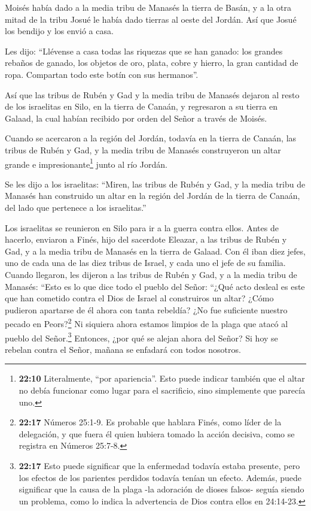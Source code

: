  Moisés había dado a la media tribu de Manasés la tierra de
Basán, y a la otra mitad de la tribu Josué le había dado tierras al
oeste del Jordán. Así que Josué los bendijo y los envió a casa.

 Les dijo: ``Llévense a casa todas las riquezas que se han
ganado: los grandes rebaños de ganado, los objetos de oro, plata, cobre
y hierro, la gran cantidad de ropa. Compartan todo este botín con sus
hermanos''.

 Así que las tribus de Rubén y Gad y la media tribu de
Manasés dejaron al resto de los israelitas en Silo, en la tierra de
Canaán, y regresaron a su tierra en Galaad, la cual habían recibido por
orden del Señor a través de Moisés.

 Cuando se acercaron a la región del Jordán, todavía en la
tierra de Canaán, las tribus de Rubén y Gad, y la media tribu de Manasés
construyeron un altar grande e impresionante\footnote{\textbf{22:10}
  Literalmente, ``por apariencia''. Esto puede indicar también que el
  altar no debía funcionar como lugar para el sacrificio, sino
  simplemente que parecía uno.} junto al río Jordán.

 Se les dijo a los israelitas: ``Miren, las tribus de Rubén
y Gad, y la media tribu de Manasés han construido un altar en la región
del Jordán de la tierra de Canaán, del lado que pertenece a los
israelitas.''

 Los israelitas se reunieron en Silo para ir a la guerra
contra ellos.  Antes de hacerlo, enviaron a Finés, hijo del
sacerdote Eleazar, a las tribus de Rubén y Gad, y a la media tribu de
Manasés en la tierra de Galaad.  Con él iban diez jefes,
uno de cada una de las diez tribus de Israel, y cada uno el jefe de su
familia.  Cuando llegaron, les dijeron a las tribus de
Rubén y Gad, y a la media tribu de Manasés:  ``Esto es lo
que dice todo el pueblo del Señor: ``¿Qué acto desleal es este que han
cometido contra el Dios de Israel al construiros un altar? ¿Cómo
pudieron apartarse de él ahora con tanta rebeldía?  ¿No fue
suficiente nuestro pecado en Peors?\footnote{\textbf{22:17} Números
  25:1-9. Es probable que hablara Finés, como líder de la delegación, y
  que fuera él quien hubiera tomado la acción decisiva, como se registra
  en Números 25:7-8.} Ni siquiera ahora estamos limpios de la plaga que
atacó al pueblo del Señor.\footnote{\textbf{22:17} Esto puede significar
  que la enfermedad todavía estaba presente, pero los efectos de los
  parientes perdidos todavía tenían un efecto. Además, puede significar
  que la causa de la plaga -la adoración de dioses falsos- seguía siendo
  un problema, como lo indica la advertencia de Dios contra ellos en
  24:14-23.}  Entonces, ¿por qué se alejan ahora del Señor?
Si hoy se rebelan contra el Señor, mañana se enfadará con todos
nosotros.

